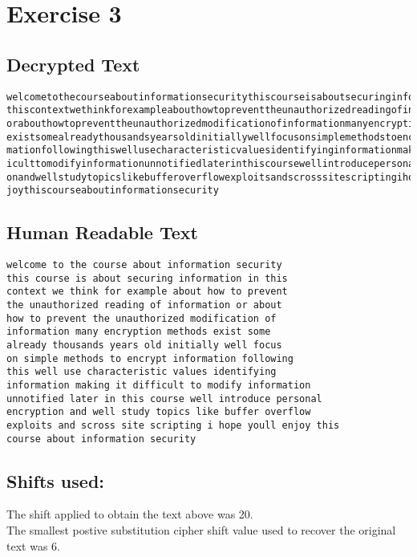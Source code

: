\documentclass[a4paper]{article}
\begin{document}
\section{Exercise 3}

\subsection{Decrypted Text}
\begin{verbatim}
welcometothecourseaboutinformationsecuritythiscourseisaboutsecuringinformationin
thiscontextwethinkforexampleabouthowtopreventtheunauthorizedreadingofinformation
orabouthowtopreventtheunauthorizedmodificationofinformationmanyencryptionmethods
existsomealreadythousandsyearsoldinitiallywellfocusonsimplemethodstoencryptinfor
mationfollowingthiswellusecharacteristicvaluesidentifyinginformationmakingitdiff
iculttomodifyinformationunnotifiedlaterinthiscoursewellintroducepersonalencrypti
onandwellstudytopicslikebufferoverflowexploitsandscrosssitescriptingihopeyoullen
joythiscourseaboutinformationsecurity
\end{verbatim}

\subsection{Human Readable Text}
\begin{verbatim}
welcome to the course about information security 
this course is about securing information in this
context we think for example about how to prevent
the unauthorized reading of information or about
how to prevent the unauthorized modification of 
information many encryption methods exist some 
already thousands years old initially well focus 
on simple methods to encrypt information following
this well use characteristic values identifying 
information making it difficult to modify information
unnotified later in this course well introduce personal
encryption and well study topics like buffer overflow
exploits and scross site scripting i hope youll enjoy this
course about information security
\end{verbatim}

\subsection{Shifts used:}
The shift applied to obtain the text above was 20.\\
The smallest postive substitution cipher shift value used to recover the original text was 6.
\end{document}
